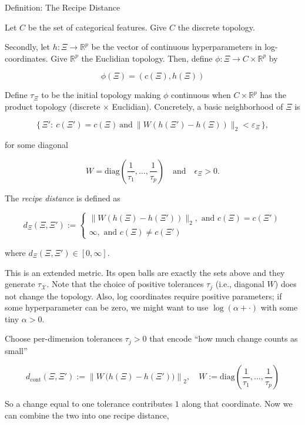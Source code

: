 \documentclass[12pt]{article}
\begin{document}
\begin{statementbox}{Definition: The Recipe Distance}

Let $C$ be the set of categorical features. Give $C$ the discrete topology. 

Secondly, let $h:\Xi \to \mathbb R^p$ be the vector of continuous hyperparameters in log-coordinates. Give $\mathbb R^p$ the Euclidian topology. Then, define $\phi:\Xi \to C\times \mathbb R^p$ by

\[
\phi(\Xi)=(c(\Xi),h(\Xi))
\]

Define $\tau_\Xi$ to be the initial topology making $\phi$ continuous when $C\times \mathbb R^p$ has the product topology (discrete $\times $ Euclidian). Concretely, a basic neighborhood of $\Xi$ is

\[
\{\,\Xi':\ c(\Xi')=c(\Xi)\ \text{and}\ \|W(h(\Xi')-h(\Xi))\|_2<\varepsilon_\Xi\,\},
\]

for some diagonal

\[
W=\text{diag}\!\left( \frac 1 {\tau_1} , \dots , \frac 1 {\tau_p}\right)\quad \text{and}\quad \epsilon_\Xi >0.
\]

The \textit{recipe distance} is defined as

\[
d_\Xi(\Xi,\Xi') :=
\begin{cases}
\|W(h(\Xi)-h(\Xi'))\|_2, \text{ and } c(\Xi)=c(\Xi')\\
\infty, \text{ and } c(\Xi)\neq c(\Xi')
\end{cases}
\]

where $d_\Xi(\Xi,\Xi')\in [0,\infty]$.

\end{statementbox}

This is an extended metric. Its open balls are exactly the sets above and they generate $\tau_\mathcal X$. Note that the choice of positive tolerances $\tau_j$ (i.e., diagonal $W$) does not change the topology. Also, log coordinates require positive parameters; if some hyperparameter can be zero, we might want to use $\log(\alpha+\cdot )$ with some tiny $\alpha>0$.

Choose per-dimension tolerances $\tau_j>0$ that encode “how much change counts as small”

\[
d_{\text{cont}}(\Xi,\Xi') 
:= \left\| W\,\big(h(\Xi)-h(\Xi')\big)\right\|_2,
\quad W:=\mathrm{diag}\!\left(\frac{1}{\tau_1},\dots,\frac{1}{\tau_p}\right)
\]

So a change equal to one tolerance contributes $1$ along that coordinate. Now we can combine the two into one recipe distance,
\end{document}
